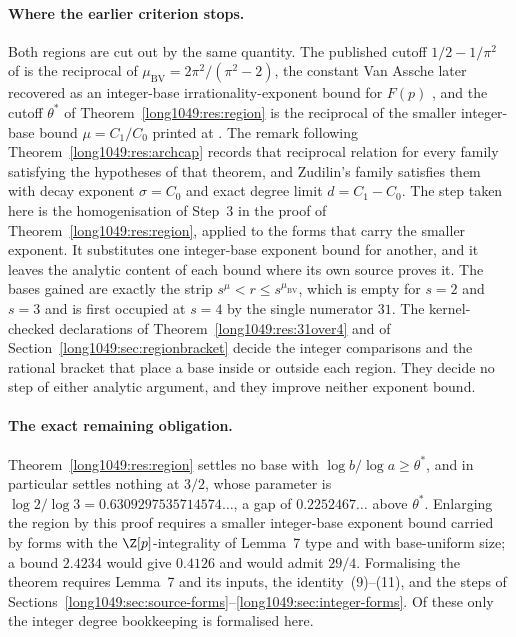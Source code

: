\documentclass[11pt]{article}
\begin{document}
\paragraph{Where the earlier criterion stops.}
Both regions are cut out by the same quantity.  The published cutoff
$1/2-1/\pi^{2}$ of \cite[Thm.~2, p.~177]{bv1994} is the reciprocal of
$\mu_{\mathrm{BV}}=2\pi^{2}/(\pi^{2}-2)$, the constant Van Assche later
recovered as an integer-base irrationality-exponent bound for $F(p)$
\cite[Thm.~1, p.~10]{vanassche2001}, and the cutoff $\theta^{*}$ of
Theorem~\ref{long1049:res:region} is the reciprocal of the smaller integer-base bound
$\mu=C_1/C_0$ printed at \cite[p.~162]{zudilin2004}.  The remark following
Theorem~\ref{long1049:res:archcap} records that reciprocal relation for every family
satisfying the hypotheses of that theorem, and Zudilin's family satisfies them
with decay exponent $\sigma=C_0$ and exact degree limit $d=C_1-C_0$.  The step
taken here is the homogenisation of Step~3 in the proof of
Theorem~\ref{long1049:res:region}, applied to the forms that carry the smaller exponent.
It substitutes one integer-base exponent bound for another, and it leaves the
analytic content of each bound where its own source proves it.  The bases
gained are exactly the strip $s^{\mu}<r\le s^{\mu_{\mathrm{BV}}}$, which is empty
for $s=2$ and $s=3$ and is first occupied at $s=4$ by the single numerator
$31$.  The kernel-checked declarations of Theorem~\ref{long1049:res:31over4} and of
Section~\ref{long1049:sec:regionbracket} decide the integer comparisons and the rational
bracket that place a base inside or outside each region.  They decide no step
of either analytic argument, and they improve neither exponent bound.

\paragraph{The exact remaining obligation.}
Theorem~\ref{long1049:res:region} settles no base with $\log b/\log a\ge\theta^{*}$, and
in particular settles nothing at $3/2$, whose parameter is
$\log2/\log3=0.6309297535714574\ldots$, a gap of $0.2252467\ldots$ above
$\theta^{*}$.  Enlarging the region by this proof requires a smaller integer-base
exponent bound carried by forms with the $\Z[p]$-integrality of Lemma~7 type and
with base-uniform size; a bound $2.4234$ would give $0.4126$ and would admit
$29/4$.  Formalising the theorem requires Lemma~7 and its inputs, the
identity~(9)--(11), and the steps of
Sections~\ref{long1049:sec:source-forms}--\ref{long1049:sec:integer-forms}.  Of these only the
integer degree bookkeeping is formalised here.
\end{document}
